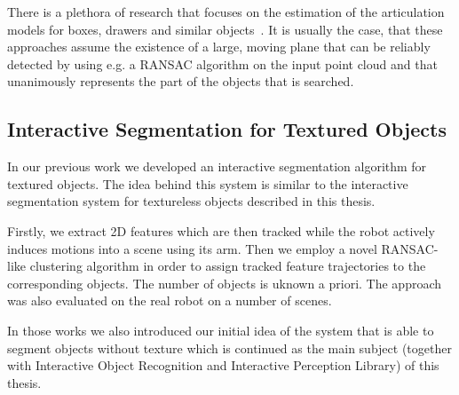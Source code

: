There is a plethora of research that focuses on the estimation of the articulation models for boxes, drawers and similar objects~\cite{Box11Saxena,
  sturm10rss-workshop}. It is usually the case, that these approaches assume the existence of a large, moving plane that can be reliably detected by using e.g. a RANSAC algorithm on the input point cloud and that  unanimously represents the part of the objects that is searched.


\subsection{Interactive Segmentation for Textured Objects}
In our previous work  we developed an interactive segmentation algorithm for textured objects. The idea behind this system is similar to the interactive segmentation system for textureless objects described in this thesis.

Firstly, we extract 2D features which are then tracked while the robot actively induces
motions into a scene using its arm. Then we employ a novel RANSAC-like clustering algorithm in order to assign tracked feature trajectories to the corresponding objects. The number of objects is uknown a priori. The approach was also evaluated on the real robot on a number of scenes.

In those works we also introduced our initial idea of the system that is able to segment objects without texture which is continued as the main subject (together with Interactive Object Recognition and Interactive Perception Library) of this thesis.  

